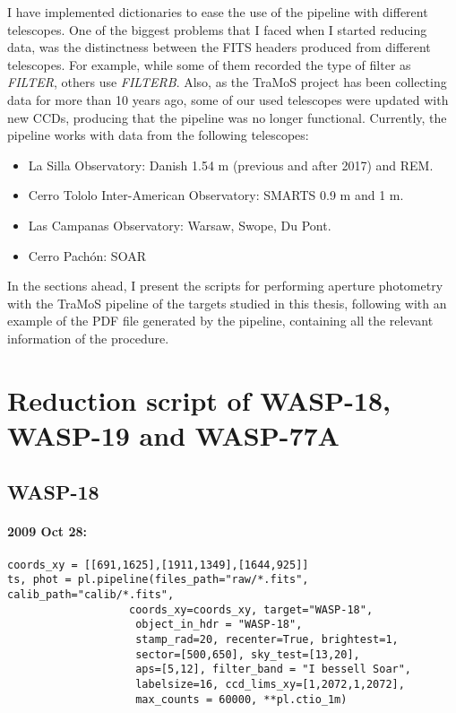 I have implemented dictionaries to ease the use of the pipeline with different telescopes. One of the biggest problems that I faced when I started reducing data, was the distinctness between the FITS headers produced from different telescopes. For example, while some of them recorded the type of filter as \textit{FILTER}, others use \textit{FILTERB}. Also, as the TraMoS project has been collecting data for more than 10 years ago, some of our used telescopes were updated with new CCDs, producing that the pipeline was no longer functional. Currently, the pipeline works with data from the following telescopes: 
\begin{itemize}
\item La Silla Observatory: Danish 1.54 m (previous and after 2017) and REM.
\item Cerro Tololo Inter-American Observatory: SMARTS 0.9 m and 1 m.
\item Las Campanas Observatory: Warsaw, Swope, Du Pont.
\item Cerro Pachón: SOAR
\end{itemize}

In the sections ahead, I present the scripts for performing aperture photometry with the TraMoS pipeline of the targets studied in this thesis, following with an example of the PDF file generated by the pipeline, containing all the relevant information of the procedure.

\section{Reduction script of WASP-18, WASP-19 and WASP-77A}
\subsection*{WASP-18}
\paragraph*{2009 Oct 28:}
\begin{verbatim}
coords_xy = [[691,1625],[1911,1349],[1644,925]]
ts, phot = pl.pipeline(files_path="raw/*.fits", calib_path="calib/*.fits", 
				   coords_xy=coords_xy, target="WASP-18",
                    object_in_hdr = "WASP-18",
                    stamp_rad=20, recenter=True, brightest=1,
                    sector=[500,650], sky_test=[13,20],
                    aps=[5,12], filter_band = "I bessell Soar",
                    labelsize=16, ccd_lims_xy=[1,2072,1,2072],
                    max_counts = 60000, **pl.ctio_1m)
\end{verbatim}

